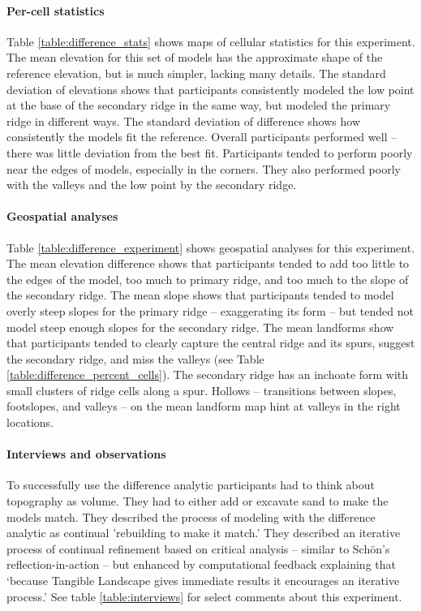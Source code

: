 \documentclass[prodmode,acmtochi]{acmsmall} %
\begin{document}
\paragraph{Per-cell statistics}
Table \ref{table:difference_stats} shows maps of cellular statistics for this experiment.
The mean elevation for this set of models
has the approximate shape of the reference elevation, 
but is much simpler, lacking many details. 
The standard deviation of elevations shows that participants 
consistently modeled the low point at the base of the secondary ridge
in the same way, 
but modeled the primary ridge in different ways. 
The standard deviation of difference shows 
how consistently the models fit the reference. 
Overall participants performed well -- there was little deviation from the best fit. 
Participants tended to perform poorly near the edges of models, especially in the corners.
They also performed poorly with the valleys and the low point by the secondary ridge.

\paragraph{Geospatial analyses}
Table \ref{table:difference_experiment} shows geospatial analyses for this experiment.
%
The mean elevation difference shows that participants tended to add
too little to the edges of the model,
too much to primary ridge,
and too much to the slope of the secondary ridge. 
The mean slope shows that participants tended to model 
overly steep slopes for the primary ridge -- exaggerating its form --
but tended not model steep enough slopes for the secondary ridge. 
The mean landforms show that participants tended to 
clearly capture the central ridge and its spurs,
suggest the secondary ridge, 
and miss the valleys (see Table \ref{table:difference_percent_cells}). 
The secondary ridge has an inchoate form 
with small clusters of ridge cells along a spur.
Hollows -- transitions between slopes, footslopes, and valleys -- 
on the mean landform map hint at valleys in the right locations.

\paragraph{Interviews and observations}
To successfully use the difference analytic 
participants had to think about topography as volume.
They had to either add or excavate sand to make the models match. 
They described the process of modeling with the difference analytic
as continual 'rebuilding to make it match.'
They described an iterative process of 
continual refinement based on critical analysis 
-- similar to Sch{\"o}n's reflection-in-action \cite{Schon1983} --
but enhanced by computational feedback 
explaining that 
`because Tangible Landscape gives immediate results it encourages an iterative process.' 
See table \ref{table:interviews} for select comments about this experiment.
\end{document}
